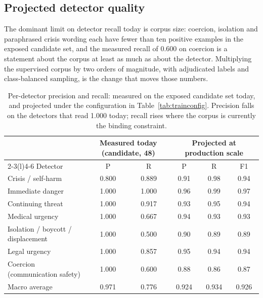 \documentclass[11pt,a4paper]{article}
\begin{document}
\subsection{Projected detector quality}
\label{sec:projdet}
The dominant limit on detector recall today is corpus size: coercion, isolation and paraphrased
crisis wording each have fewer than ten positive examples in the exposed candidate set, and the
measured recall of 0.600 on coercion is a statement about the corpus at least as much as about the
detector. Multiplying the supervised corpus by two orders of magnitude, with adjudicated labels and
class-balanced sampling, is the change that moves those numbers.

\begin{table}[!htbp]
\centering\footnotesize
\caption{Per-detector precision and recall: measured on the exposed candidate set today, and
projected under the configuration in Table~\ref{tab:trainconfig}. Precision falls on the detectors
that read 1.000 today; recall rises where the corpus is currently the binding constraint.}
\label{tab:projdet}
\setlength{\tabcolsep}{7pt}
\begin{tabular}{@{}lccccc@{}}
\toprule
& \multicolumn{2}{c}{Measured today (candidate, 48)} & \multicolumn{3}{c}{Projected at production scale} \\
\cmidrule(lr){2-3}\cmidrule(l){4-6}
Detector & P & R & P & R & F1 \\
\midrule
Crisis / self-harm & 0.800 & 0.889 & 0.91 & 0.98 & 0.94 \\
Immediate danger & 1.000 & 1.000 & 0.96 & 0.99 & 0.97 \\
Continuing threat & 1.000 & 0.917 & 0.93 & 0.95 & 0.94 \\
Medical urgency & 1.000 & 0.667 & 0.94 & 0.93 & 0.93 \\
Isolation / boycott / displacement & 1.000 & 0.500 & 0.90 & 0.89 & 0.89 \\
Legal urgency & 1.000 & 0.857 & 0.95 & 0.94 & 0.94 \\
Coercion (communication safety) & 1.000 & 0.600 & 0.88 & 0.86 & 0.87 \\
\midrule
Macro average & 0.971 & 0.776 & 0.924 & 0.934 & 0.926 \\
\bottomrule
\end{tabular}
\end{table}
\end{document}
